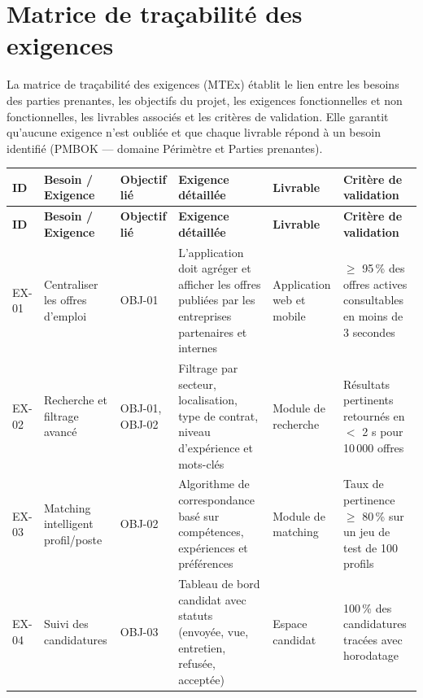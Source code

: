 \documentclass[11pt,a4paper]{article}
\begin{document}
\section{Matrice de traçabilité des exigences}

La matrice de traçabilité des exigences (MTEx) établit le lien entre les besoins des parties prenantes, les objectifs du projet, les exigences fonctionnelles et non fonctionnelles, les livrables associés et les critères de validation. Elle garantit qu'aucune exigence n'est oubliée et que chaque livrable répond à un besoin identifié (PMBOK --- domaine Périmètre et Parties prenantes).

\vspace{0.4em}
\small
\begin{longtable}{|p{0.7cm}|p{2.8cm}|p{2.2cm}|p{2.8cm}|p{2.5cm}|p{2cm}|}
    \hline
    \rowcolor{ifrigray}
    \textbf{ID} & \textbf{Besoin / Exigence} & \textbf{Objectif lié} & \textbf{Exigence détaillée} & \textbf{Livrable} & \textbf{Critère de validation} \\
    \hline
    \endfirsthead
    \hline
    \rowcolor{ifrigray}
    \textbf{ID} & \textbf{Besoin / Exigence} & \textbf{Objectif lié} & \textbf{Exigence détaillée} & \textbf{Livrable} & \textbf{Critère de validation} \\
    \hline
    \endhead
    \hline
    \endfoot

    EX-01 &
    Centraliser les offres d'emploi &
    OBJ-01 &
    L'application doit agréger et afficher les offres publiées par les entreprises partenaires et internes &
    Application web et mobile &
    $\geq$ 95\,\% des offres actives consultables en moins de 3 secondes \\
    \hline

    EX-02 &
    Recherche et filtrage avancé &
    OBJ-01, OBJ-02 &
    Filtrage par secteur, localisation, type de contrat, niveau d'expérience et mots-clés &
    Module de recherche &
    Résultats pertinents retournés en $<$ 2 s pour 10\,000 offres \\
    \hline

    EX-03 &
    Matching intelligent profil/poste &
    OBJ-02 &
    Algorithme de correspondance basé sur compétences, expériences et préférences &
    Module de matching &
    Taux de pertinence $\geq$ 80\,\% sur un jeu de test de 100 profils \\
    \hline

    EX-04 &
    Suivi des candidatures &
    OBJ-03 &
    Tableau de bord candidat avec statuts (envoyée, vue, entretien, refusée, acceptée) &
    Espace candidat &
    100\,\% des candidatures tracées avec horodatage \\
    \hline


\end{longtable}
\end{document}
